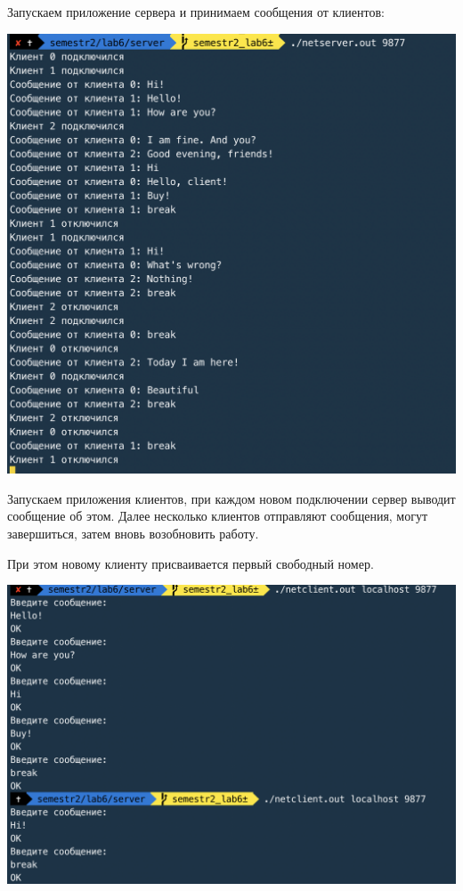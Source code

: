 \documentclass[a4paper,14pt]{extreport} %
\begin{document}
\newpage

Запускаем приложение сервера и принимаем сообщения от клиентов:

\includegraphics[scale=0.9]{server21}

\newpage

Запускаем приложения клиентов, при каждом новом подключении сервер выводит сообщение об этом. Далее несколько клиентов отправляют сообщения, могут завершиться, затем вновь возобновить работу. 

При этом новому клиенту присваивается первый свободный номер. 

\includegraphics[scale=0.8]{client21}
\end{document}
